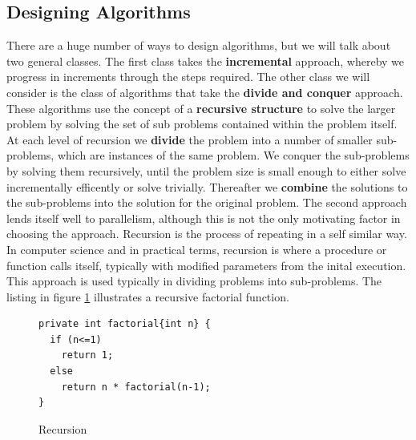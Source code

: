 \documentclass[10pt,a4paper]{article}
\begin{document}
\subsection{Designing Algorithms}
There are a huge number of ways to design algorithms, but we will talk about two general classes. The first class takes the {\bf incremental} approach, whereby we progress in increments through the steps required. The other class we will consider is the class of algorithms that take the {\bf divide and conquer} approach. These algorithms use the concept of a {\bf recursive structure} to solve the larger problem by solving the set of sub problems contained within the problem itself. At each level of recursion we {\bf divide} the problem into a number of smaller sub-problems, which are instances of the same problem. We conquer the sub-problems by solving them recursively, until the problem size is small enough to either solve incrementally efficently or solve trivially. Thereafter we {\bf combine} the solutions  to the sub-problems into the solution for the original problem. The second approach lends itself well to parallelism, although this is not the only motivating factor in choosing the approach. 
\newline\newline
Recursion is the process of repeating in a self similar way. In computer science and in practical terms, recursion is where a procedure or function calls itself, typically with modified parameters from the inital execution. This approach is used typically in dividing problems into sub-problems. The listing in figure \ref{faclisting} illustrates a recursive factorial function. 

\begin{figure}
\caption{Recursion}
\begin{center}
\begin{lstlisting}
private int factorial{int n} {
  if (n<=1) 
    return 1;
  else 
    return n * factorial(n-1);
}
\end{lstlisting}
\label{faclisting}
\end{center}
\end{figure}
\end{document}
